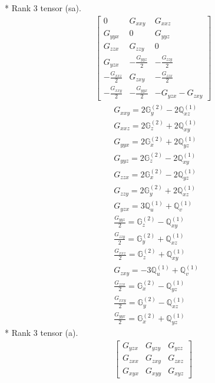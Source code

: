 \documentclass[fleqn,8pt,landscape]{jsarticle}
\begin{document}
* Rank 3 tensor (sa).
\begin{align*}
\begin{bmatrix} 0 & G_{xxy} & G_{xxz} \\ G_{yyx} & 0 & G_{yyz} \\ G_{zzx} & G_{zzy} & 0 \\ G_{yzx} & - \frac{G_{yyz}}{2} & - \frac{G_{zzy}}{2} \\ - \frac{G_{xxz}}{2} & G_{zxy} & - \frac{G_{zzx}}{2} \\ - \frac{G_{xxy}}{2} & - \frac{G_{yyx}}{2} & - G_{yzx} - G_{zxy} \end{bmatrix}
\end{align*}
\begin{align*}
& G_{xxy} = 2 \mathbb{G}_{y}^{(2)} - 2 \mathbb{Q}_{xz}^{(1)} \\
& G_{xxz} = 2 \mathbb{G}_{z}^{(2)} + 2 \mathbb{Q}_{xy}^{(1)} \\
& G_{yyx} = 2 \mathbb{G}_{x}^{(2)} + 2 \mathbb{Q}_{yz}^{(1)} \\
& G_{yyz} = 2 \mathbb{G}_{z}^{(2)} - 2 \mathbb{Q}_{xy}^{(1)} \\
& G_{zzx} = 2 \mathbb{G}_{x}^{(2)} - 2 \mathbb{Q}_{yz}^{(1)} \\
& G_{zzy} = 2 \mathbb{G}_{y}^{(2)} + 2 \mathbb{Q}_{xz}^{(1)} \\
& G_{yzx} = 3 \mathbb{Q}_{u}^{(1)} + \mathbb{Q}_{v}^{(1)} \\
& \frac{G_{yyz}}{2} = \mathbb{G}_{z}^{(2)} - \mathbb{Q}_{xy}^{(1)} \\
& \frac{G_{zzy}}{2} = \mathbb{G}_{y}^{(2)} + \mathbb{Q}_{xz}^{(1)} \\
& \frac{G_{xxz}}{2} = \mathbb{G}_{z}^{(2)} + \mathbb{Q}_{xy}^{(1)} \\
& G_{zxy} = - 3 \mathbb{Q}_{u}^{(1)} + \mathbb{Q}_{v}^{(1)} \\
& \frac{G_{zzx}}{2} = \mathbb{G}_{x}^{(2)} - \mathbb{Q}_{yz}^{(1)} \\
& \frac{G_{xxy}}{2} = \mathbb{G}_{y}^{(2)} - \mathbb{Q}_{xz}^{(1)} \\
& \frac{G_{yyx}}{2} = \mathbb{G}_{x}^{(2)} + \mathbb{Q}_{yz}^{(1)}
\end{align*}
* Rank 3 tensor (a).
\begin{align*}
\begin{bmatrix} G_{yzx} & G_{yzy} & G_{yzz} \\ G_{zxx} & G_{zxy} & G_{zxz} \\ G_{xyx} & G_{xyy} & G_{xyz} \end{bmatrix}
\end{align*}
\end{document}
